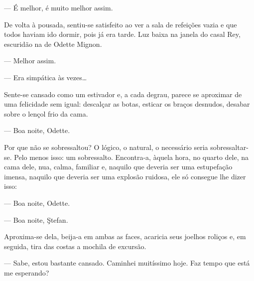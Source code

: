 
--- É melhor, é muito melhor assim.


De volta à pousada, sentiu-se satisfeito ao ver a sala de refeições
vazia e que todos haviam ido dormir, pois já era tarde. Luz baixa na
janela do casal Rey, escuridão na de Odette Mignon.

--- Melhor assim.


--- Era simpática às vezes\ldots{}


Sente-se cansado como um estivador e, a cada degrau, parece se aproximar
de uma felicidade sem igual: descalçar as botas, esticar os braços
desnudos, desabar sobre o lençol frio da cama.


--- Boa noite, Odette.

Por que não se sobressaltou? O lógico, o natural, o necessário seria
sobressaltar-se. Pelo menos isso: um sobressalto. Encontra-a, àquela
hora, no quarto dele, na cama dele, nua, calma, familiar e, naquilo que
deveria ser uma estupefação imensa, naquilo que deveria ser uma explosão
ruidosa, ele só consegue lhe dizer isso:

--- Boa noite, Odette.

--- Boa noite, Ştefan.

Aproxima-se dela, beija-a em ambas as faces, acaricia seus joelhos
roliços e, em seguida, tira das costas a mochila de excursão.

--- Sabe, estou bastante cansado. Caminhei muitíssimo hoje. Faz tempo
que está me esperando?

